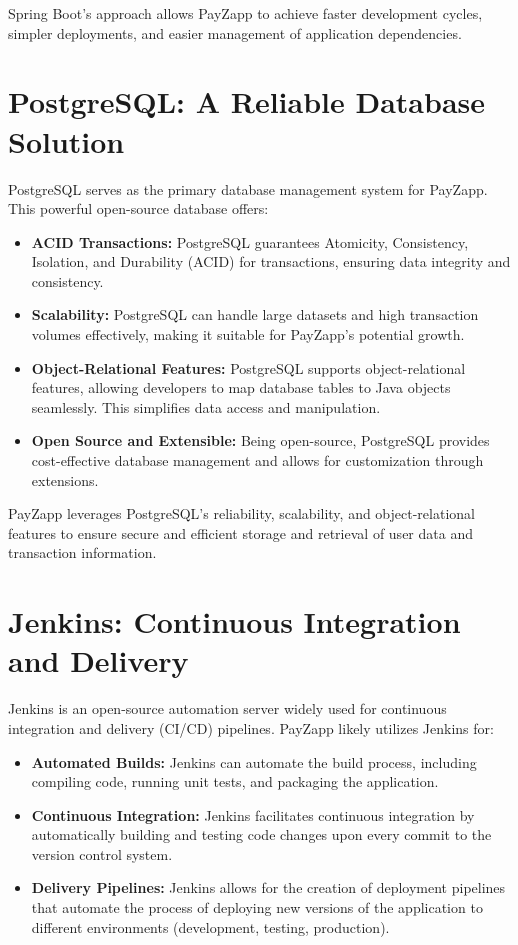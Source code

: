 \documentclass[12pt,a4paper]{report}
\begin{document}
Spring Boot's approach allows PayZapp to achieve faster development cycles, simpler deployments, and easier management of application dependencies.

\section{PostgreSQL: A Reliable Database Solution}

PostgreSQL serves as the primary database management system for PayZapp. This powerful open-source database offers:

\begin{itemize}
    \item \textbf{ACID Transactions:} PostgreSQL guarantees Atomicity, Consistency, Isolation, and Durability (ACID) for transactions, ensuring data integrity and consistency.
    
    \item \textbf{Scalability:} PostgreSQL can handle large datasets and high transaction volumes effectively, making it suitable for PayZapp's potential growth.
    
    \item \textbf{Object-Relational Features:} PostgreSQL supports object-relational features, allowing developers to map database tables to Java objects seamlessly. This simplifies data access and manipulation.
    
    \item \textbf{Open Source and Extensible:} Being open-source, PostgreSQL provides cost-effective database management and allows for customization through extensions.
\end{itemize}

PayZapp leverages PostgreSQL's reliability, scalability, and object-relational features to ensure secure and efficient storage and retrieval of user data and transaction information.

\section{Jenkins: Continuous Integration and Delivery}

Jenkins is an open-source automation server widely used for continuous integration and delivery (CI/CD) pipelines. PayZapp likely utilizes Jenkins for:

\begin{itemize}
    \item \textbf{Automated Builds:} Jenkins can automate the build process, including compiling code, running unit tests, and packaging the application.
    
    \item \textbf{Continuous Integration:} Jenkins facilitates continuous integration by automatically building and testing code changes upon every commit to the version control system.
    
    \item \textbf{Delivery Pipelines:} Jenkins allows for the creation of deployment pipelines that automate the process of deploying new versions of the application to different environments (development, testing, production).
\end{itemize}
\end{document}
